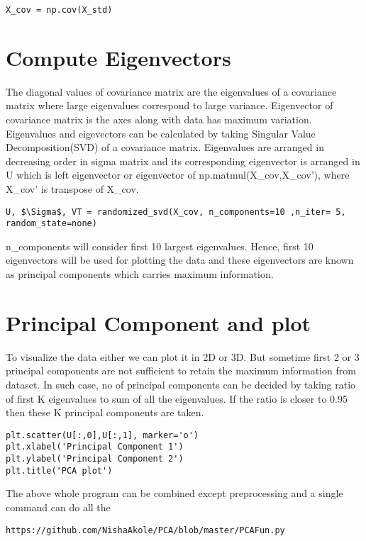 \documentclass[journal,12pt,twocolumn]{IEEEtran}
\begin{document}
\begin{lstlisting}[mathescape=true]
X_cov = np.cov(X_std)
\end{lstlisting}

\section{Compute Eigenvectors}
The diagonal values of covariance matrix are the eigenvalues of a covariance matrix where large eigenvalues correspond to large variance. Eigenvector of covariance matrix is the axes along with data has maximum variation. Eigenvalues and eigevectors can be calculated by taking Singular Value Decomposition(SVD) of a covariance matrix. Eigenvalues are arranged in decreasing order in sigma matrix and its corresponding eigenvector is arranged in U which is left eigenvector or eigenvector of np.matmul(X\_cov,X\_cov'), where X\_cov' is transpose of X\_cov.
\begin{lstlisting}[mathescape=true]
U, $\Sigma$, VT = randomized_svd(X_cov, n_components=10 ,n_iter= 5, random_state=none)
\end{lstlisting}
n\_components will consider first 10 largest eigenvalues. Hence, first 10 eigenvectors will be used for plotting the data and these eigenvectors are known as principal components which carries maximum information.

\section{Principal Component and plot}
To visualize the data either we can plot it in 2D or 3D. But sometime first 2 or 3 principal components are not sufficient to retain the maximum information from dataset. In such case, no of principal components can be decided by taking ratio of first K eigenvalues to sum of all the eigenvalues. If the ratio is closer to 0.95 then these K principal components are taken. 
\begin{lstlisting}[mathescape=true]
plt.scatter(U[:,0],U[:,1], marker='o')
plt.xlabel('Principal Component 1')
plt.ylabel('Principal Component 2')
plt.title('PCA plot')
\end{lstlisting}
  
The above whole program can be combined except preprocessing and a single command can do all the  
\begin{lstlisting}[mathescape=true]
https://github.com/NishaAkole/PCA/blob/master/PCAFun.py
\end{lstlisting}
\end{document}
